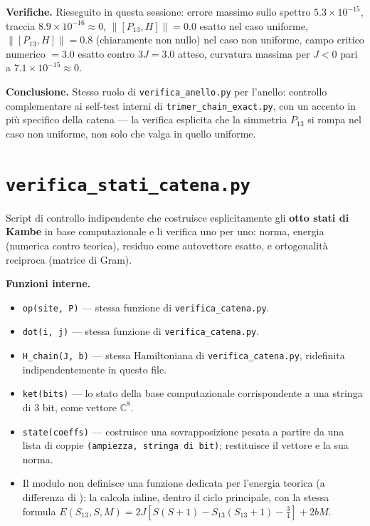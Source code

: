 \documentclass[11pt,a4paper]{article}
\begin{document}
\textbf{Verifiche.} Rieseguito in questa sessione: errore massimo sullo spettro
$5.3\times10^{-15}$, traccia $8.9\times10^{-16}\approx0$, $\|[P_{13},H]\|=0.0$ esatto
nel caso uniforme, $\|[P_{13},H]\|=0.8$ (chiaramente non nullo) nel caso non
uniforme, campo critico numerico $=3.0$ esatto contro $3J=3.0$ atteso, curvatura
massima per $J<0$ pari a $7.1\times10^{-15}\approx0$.

\textbf{Conclusione.} Stesso ruolo di \texttt{verifica\_anello.py} per l'anello:
controllo complementare ai self-test interni di \texttt{trimer\_chain\_exact.py}, con
un accento in più specifico della catena — la verifica esplicita che la simmetria
$P_{13}$ si rompa nel caso non uniforme, non solo che valga in quello uniforme.

\section*{\texttt{verifica\_stati\_catena.py}}

Script di controllo indipendente che costruisce esplicitamente gli \textbf{otto
stati di Kambe} in base computazionale e li verifica uno per uno: norma, energia
(numerica contro teorica), residuo come autovettore esatto, e ortogonalità reciproca
(matrice di Gram).

\textbf{Funzioni interne.}
\begin{itemize}
\item \texttt{op(site,\ P)} — stessa funzione di \texttt{verifica\_catena.py}.
\item \texttt{dot(i,\ j)} — stessa funzione di \texttt{verifica\_catena.py}.
\item \texttt{H\_chain(J,\ b)} — stessa Hamiltoniana di \texttt{verifica\_catena.py},
ridefinita indipendentemente in questo file.
\item \texttt{ket(bits)} — lo stato della base computazionale corrispondente a una
stringa di 3 bit, come vettore $\mathbb C^8$.
\item \texttt{state(coeffs)} — costruisce una sovrapposizione pesata a partire da una
lista di coppie \texttt{(ampiezza, stringa di bit)}; restituisce il vettore e la sua
norma.
\item Il modulo non definisce una funzione dedicata per l'energia teorica (a
differenza di \texttt{}): la calcola inline, dentro il
ciclo principale, con la stessa formula
$E(S_{13},S,M)=2J[S(S{+}1)-S_{13}(S_{13}{+}1)-\tfrac34]+2bM$.
\end{itemize}
\end{document}
